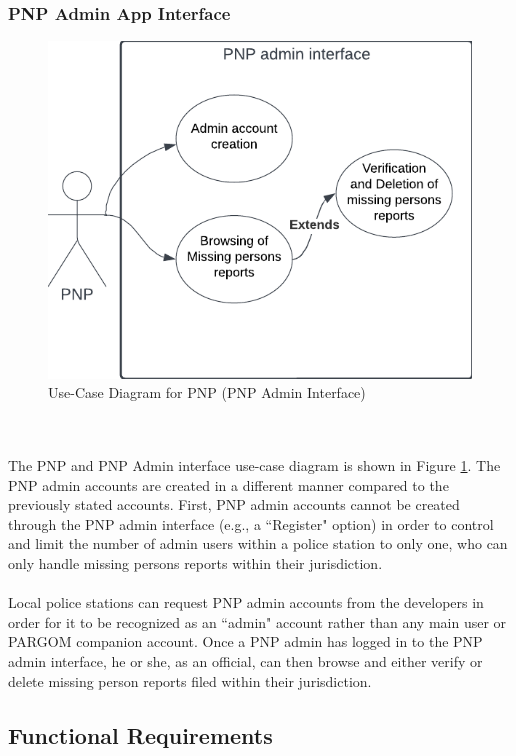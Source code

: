 \subsubsection{PNP Admin App Interface}

\begin{figure}[!h]
    \centering
    \includegraphics[width=\textwidth]{figures/Chapter3/Chapt3_UseCase_PNP.png}
    \caption{Use-Case Diagram for PNP (PNP Admin Interface)}
    \label{fig:UseCasePNP}
\end{figure}
\\\\The PNP and PNP Admin interface use-case diagram is shown in Figure \ref{fig:UseCasePNP}. The PNP admin accounts are created in a different manner compared to the previously stated accounts. First, PNP admin accounts cannot be created through the PNP admin interface (e.g., a ``Register" option) in order to control and limit the number of admin users within a police station to only one, who can only handle missing persons reports within their jurisdiction. 
\\\\Local police stations can request PNP admin accounts from the developers in order for it to be recognized as an ``admin" account rather than any main user or PARGOM companion account. Once a PNP admin has logged in to the PNP admin interface, he or she, as an official, can then browse and either verify or delete missing person reports filed within their jurisdiction.

\subsection{Functional Requirements}
